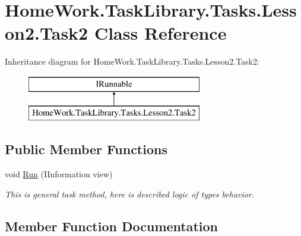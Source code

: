 \hypertarget{class_home_work_1_1_task_library_1_1_tasks_1_1_lesson2_1_1_task2}{}\section{Home\+Work.\+Task\+Library.\+Tasks.\+Lesson2.\+Task2 Class Reference}
\label{class_home_work_1_1_task_library_1_1_tasks_1_1_lesson2_1_1_task2}
Inheritance diagram for Home\+Work.\+Task\+Library.\+Tasks.\+Lesson2.\+Task2\+:\begin{figure}[H]
\begin{center}
\leavevmode
\includegraphics[height=2.000000cm]{class_home_work_1_1_task_library_1_1_tasks_1_1_lesson2_1_1_task2}
\end{center}
\end{figure}
\subsection*{Public Member Functions}
\begin{DoxyCompactItemize}
\item 
void \mbox{\hyperlink{class_home_work_1_1_task_library_1_1_tasks_1_1_lesson2_1_1_task2_ab8d2be9a7b370c9d32b10a900ec950cf}{Run}} (I\+Information view)
\begin{DoxyCompactList}\small\item\em This is general task method, here is described logic of types behavior. \end{DoxyCompactList}\end{DoxyCompactItemize}


\subsection{Member Function Documentation}
\mbox{\label{class_home_work_1_1_task_library_1_1_tasks_1_1_lesson2_1_1_task2_ab8d2be9a7b370c9d32b10a900ec950cf}} 
